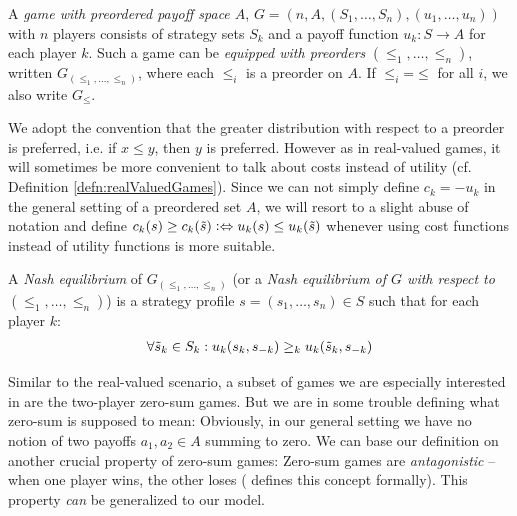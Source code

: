 \documentclass[a4paper]{scrreprt}
\begin{document}
    \begin{defn}
        A \emph{game with preordered payoff space $A$}, $G = (n, A, (S_1, \dots, S_n), (u_1, \dots, u_n))$ with $n$ players consists of strategy sets $S_k$ and a payoff function $u_k: S \to A$ for each player $k$.        
        Such a game can be \emph{equipped with preorders} $(\leq_1, \dots, \leq_n)$, written $G_{(\leq_1, \dots, \leq_n)}$, where each $\leq_i$ is a preorder on $A$.
        If $\leq_i \mathbin{=} \leq$ for all $i$, we also write $G_\leq$.
    \end{defn}
    We adopt the convention that the greater distribution with respect to a preorder is preferred, i.e. if $x \leq y$, then $y$ is preferred. However as in real-valued games, it will sometimes be more convenient to talk about costs instead of utility (cf. Definition \ref{defn:realValuedGames}). Since we can not simply define $c_k = -u_k$ in the general setting of a preordered set $A$, we will resort to a slight abuse of notation and define $c_k(s) \geq c_k(\tilde{s}) \mathrel{\vcentcolon\Leftrightarrow} u_k(s) \leq u_k(\tilde{s})$ whenever using cost functions instead of utility functions is more suitable.
    
    \begin{defn}
        A \emph{Nash equilibrium} of $G_{(\leq_1, \dots, \leq_n)}$ (or a \emph{Nash equilibrium of $G$ with respect to $(\leq_1, \dots, \leq_n)$})
        is a strategy profile $s = (s_1, \dots, s_n) \in S$ such that for each player $k$:
        \begin{gather}
            \forall \tilde{s}_k \in S_k: u_k(s_k, s_{-k}) \geq_k u_k(\tilde{s}_k, s_{-k})
            \label{eq:nashEquilibriumPreorderedPayoffs}
        \end{gather}
    \end{defn}
    
    Similar to the real-valued scenario, a subset of games we are especially interested in are the two-player zero-sum games.
    But we are in some trouble defining what zero-sum is supposed to mean: Obviously, in our general setting we have no notion of two payoffs $a_1, a_2 \in A$ summing to zero.
    We can base our definition on another crucial property of zero-sum games: Zero-sum games are \emph{antagonistic} -- when one player wins, the other loses (\cite{bib:andersonAntagonisticGames} defines this concept formally). This property \emph{can} be generalized to our model.
    
\end{document}
